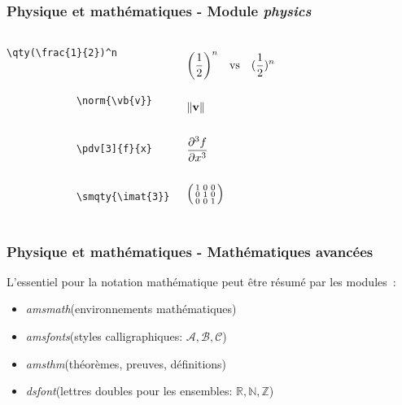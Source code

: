 \begin{frame}[fragile]
    \frametitle{Physique et mathématiques - Module \textit{physics}}
    \begin{columns}
        \begin{lstlisting}[xleftmargin=-2cm]
            \qty(\frac{1}{2})^n


            \norm{\vb{v}}


            \pdv[3]{f}{x}


            \smqty{\imat{3}}
        \end{lstlisting}
        \vspace{-0.3cm}
        \begin{align*}
            &\qty(\frac{1}{2})^n\qq{vs}(\frac{1}{2})^n \\\\
            &\norm{\vb{v}} \\\\
            &\pdv[3]{f}{x} \\\\
            &\smqty(\imat{3})
        \end{align*}
    \end{columns}
\end{frame}

\begin{frame}
  \frametitle{Physique et mathématiques - Mathématiques avancées}
  L'essentiel pour la notation mathématique peut être résumé par les modules~:
  \vspace{0.3cm}
  \pause
    \begin{itemize}
        \item[$\diamond$] \textcolor{vibrant_green}{\textit{amsmath}}\footnotemark (environnements mathématiques)
        \item[$\diamond$] \textcolor{vibrant_green}{\textit{amsfonts}}\footnotemark (styles calligraphiques: $\mathcal{A}, \mathcal{B}, \mathcal{C}$)
        \item[$\diamond$] \textcolor{vibrant_green}{\textit{amsthm}}\footnotemark(théorèmes, preuves, définitions)
        \item[$\diamond$] \textcolor{vibrant_green}{\textit{dsfont}}\footnotemark (lettres doubles pour les ensembles: $\mathds{R}, \mathds{N}, \mathds{Z}$)
    \end{itemize}
\end{frame}

